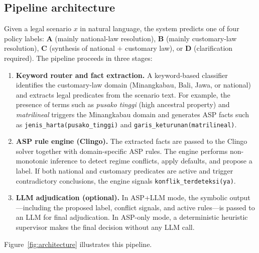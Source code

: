 \documentclass[pdflatex,sn-basic,Numbered]{sn-jnl}
\begin{document}
\subsection{Pipeline architecture}\label{subsec:arch}

Given a legal scenario $x$ in natural language, the system predicts one of four policy labels: \textbf{A} (mainly national-law resolution), \textbf{B} (mainly customary-law resolution), \textbf{C} (synthesis of national + customary law), or \textbf{D} (clarification required).
The pipeline proceeds in three stages:

\begin{enumerate}
  \item \textbf{Keyword router and fact extraction.} A keyword-based classifier identifies the customary-law domain (Minangkabau, Bali, Jawa, or national) and extracts legal predicates from the scenario text. For example, the presence of terms such as \textit{pusako tinggi} (high ancestral property) and \textit{matrilineal} triggers the Minangkabau domain and generates ASP facts such as \texttt{jenis\_harta(pusako\_tinggi)} and \texttt{garis\_keturunan(matrilineal)}.
  \item \textbf{ASP rule engine (Clingo).} The extracted facts are passed to the Clingo solver together with domain-specific ASP rules. The engine performs non-monotonic inference to detect regime conflicts, apply defaults, and propose a label. If both national and customary predicates are active and trigger contradictory conclusions, the engine signals \texttt{konflik\_terdeteksi(ya)}.
  \item \textbf{LLM adjudication (optional).} In ASP+LLM mode, the symbolic output---including the proposed label, conflict signals, and active rules---is passed to an LLM for final adjudication. In ASP-only mode, a deterministic heuristic supervisor makes the final decision without any LLM call.
\end{enumerate}

Figure~\ref{fig:architecture} illustrates this pipeline.
\end{document}

